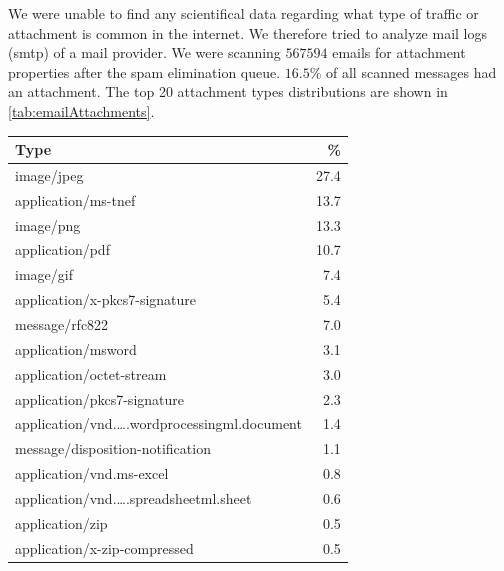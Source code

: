 We were unable to find any scientifical data regarding what type of traffic or attachment is common in the internet. We therefore tried to analyze mail logs (smtp) of a mail provider. We were scanning $567594$ emails for attachment properties after the spam elimination queue. $16.5\%$ of all scanned messages had an attachment. The top 20 attachment types distributions are shown in \ref{tab:emailAttachments}.
\begin{table}[H]

\begin{tabular}{l|r}\hline
	Type																		& \%\\\hline
	image/jpeg                                                                  &	27.4\\
	application/ms-tnef	                                                        &	13.7\\
	image/png                                                                   &	13.3\\
	application/pdf                                                             &	10.7\\
	image/gif                                                                   &	7.4\\
	application/x-pkcs7-signature                                               &	5.4\\
	message/rfc822                                                              &	7.0\\
	application/msword                                                          &	3.1\\
	application/octet-stream                                                    &	3.0\\
	application/pkcs7-signature                                                 &	2.3\\
	application/vnd.\ldots.wordprocessingml.document	                        & 	1.4\\
	message/disposition-notification                                            &	1.1\\
	application/vnd.ms-excel                                                    &	0.8\\
	application/vnd.\ldots.spreadsheetml.sheet                                  &	0.6\\
	application/zip                                                             &	0.5\\
	application/x-zip-compressed                                                &	0.5\\

\end{tabular}
\end{table}
